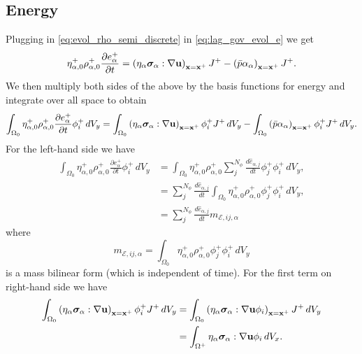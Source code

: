 \documentclass[11pt]{report}
\begin{document}
\subsection{Energy}
Plugging in \cref{eq:evol_rho_semi_discrete} in \cref{eq:lag_gov_evol_e} we get
\begin{equation*}
    \eta^+_{\alpha,0} \rho^+_{\alpha,0} \frac{\partial e^+_\alpha}{\partial t} = \left ( \eta_\alpha \bm \sigma_\alpha : \nabla \mathbf{u} \right )_{\mathbf{x} = \mathbf{x}^+} J^+ - \left( \bar{p} \alpha_\alpha \right)_{\mathbf{x}=\mathbf{x}^+} J^+.
\end{equation*}
We then multiply both sides of the above by the basis functions for energy and integrate over all space to obtain
\begin{equation*}
    \int_{\Omega_0} \eta^+_{\alpha,0} \rho^+_{\alpha,0} \frac{\partial e^+_\alpha}{\partial t} \phi_i^+ \, dV_y = \int_{\Omega_0} \left ( \eta_\alpha \bm \sigma_\alpha : \nabla \mathbf{u} \right )_{\mathbf{x} = \mathbf{x}^+} \phi_i^+ J^+ \, dV_y - \int_{\Omega_0} \left( \bar{p} \alpha_\alpha \right)_{\mathbf{x}=\mathbf{x}^+} \phi^+_i J^+ \, dV_y.
\end{equation*}
For the left-hand side we have
\begin{align*}
    \int_{\Omega_0} \eta^+_{\alpha,0} \rho^+_{\alpha,0} \frac{\partial e^+_\alpha}{\partial t} \phi_i^+ \, dV_y &= \int_{\Omega_0} \eta^+_{\alpha,0} \rho^+_{\alpha,0} \sum_j^{N_\phi} \frac{d \hat{e}_{\alpha,j}}{dt} \phi_j^+ \phi_i^+ \, dV_y , \nonumber \\
    &= \sum_j^{N_\phi} \frac{d \hat{e}_{\alpha,j}}{dt} \int_{\Omega_0} \eta^+_{\alpha,0} \rho^+_{\alpha,0} \phi_j^+ \phi_i^+ \, dV_y , \nonumber \\
    &= \sum_j^{N_\phi} \frac{d \hat{e}_{\alpha,j}}{dt} m_{\mathcal{E},ij,\alpha}
\end{align*}
where
\begin{equation}
    m_{\mathcal{E},ij,\alpha} = \int_{\Omega_0} \eta^+_{\alpha,0} \rho^+_{\alpha,0} \phi_j^+ \phi_i^+ \, dV_y
\end{equation}
is a mass bilinear form (which is independent of time). For the first term on right-hand side we have
\begin{align*}
    \int_{\Omega_0} \left ( \eta_\alpha \bm \sigma_\alpha : \nabla \mathbf{u} \right )_{\mathbf{x} = \mathbf{x}^+} \phi_i^+ J^+ \, dV_y &= \int_{\Omega_0} \left ( \eta_\alpha \bm \sigma_\alpha : \nabla \mathbf{u} \phi_i \right )_{\mathbf{x} = \mathbf{x}^+} J^+ \, dV_y \nonumber \\
    &= \int_{\Omega^+} \eta_\alpha \bm \sigma_\alpha : \nabla \mathbf{u} \phi_i \, dV_x. 
\end{align*}
\end{document}
